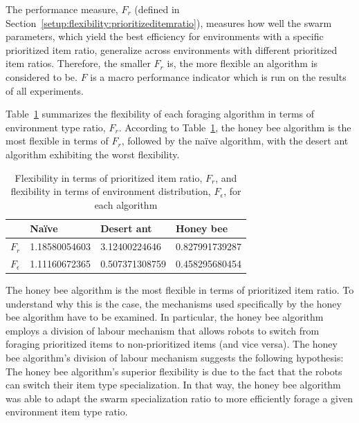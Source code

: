 The performance measure, $F_r$ (defined in Section~\ref{setup:flexibility:prioritizeditemratio}), measures how well the swarm parameters, which yield the best efficiency for environments with a specific prioritized item ratio, generalize across environments with different prioritized item ratios. Therefore, the smaller $F_r$ is, the more flexible an algorithm is considered to be. $F$ is a macro performance indicator which is run on the results of all experiments. 

Table~\ref{table:flexibility} summarizes the flexibility of each foraging algorithm in terms of environment type ratio, $F_r$. According to Table~\ref{table:flexibility}, the honey bee algorithm is the most flexible in terms of $F_r$, followed by the na\"ive algorithm, with the desert ant algorithm exhibiting the worst flexibility. 

 
\begin{table}[!htbp]
\centering
\caption{Flexibility in terms of prioritized item ratio, $F_r$, and flexibility in terms of environment distribution, $F_\epsilon$, for each algorithm}
\label{table:flexibility}
\begin{tabular}{@{}llll@{}}
\toprule
\textbf{}         & Na\"ive         & Desert ant        & Honey bee         \\ \midrule
\textbf{$F_r$}    & 1.18580054603 & 3.12400224646     & 0.827991739287    \\ \midrule
\textbf{$F_\epsilon$} & 1.11160672365 & 0.507371308759 & 0.458295680454 
\end{tabular}
\end{table}

The honey bee algorithm is the most flexible in terms of prioritized item ratio. To understand why this is the case, the mechanisms used specifically by the honey bee algorithm have to be examined. In particular, the honey bee algorithm employs a division of labour mechanism that allows robots to switch from foraging prioritized items to non-prioritized items (and vice versa). The honey bee algorithm's division of labour mechanism suggests the following hypothesis: The honey bee algorithm's superior flexibility is due to the fact that the robots can switch their item type specialization. In that way, the honey bee algorithm was able to adapt the swarm specialization ratio to more efficiently forage a given environment item type ratio.

